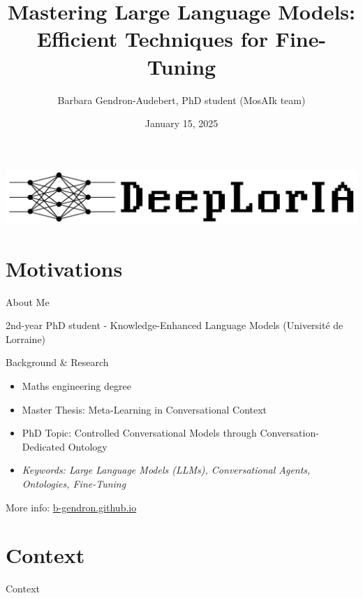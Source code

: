 \documentclass[11pt,aspectratio=169]{beamer}
\author[Barbara Gendron]{\large Barbara Gendron-Audebert, PhD student (MosAIk team)}
\title[Mastering LLM Fine-Tuning]{\huge Mastering Large Language Models: Efficient Techniques for Fine-Tuning}
\date{January 15, 2025}
\institute[DeepLorIA tutorial]{\large LORIA, Université de Lorraine, CNRS\\ DeepLorIA Network}
\begin{document}
\begin{frame}[plain]
    \vspace*{5pt}
    \begin{center}
        \includegraphics[scale=0.35]{DeepLorIA_logo1.png}
    \end{center}
    \titlepage
\end{frame}

\section{Motivations}

\begin{frame}{About Me}
\begin{center}
    2nd-year PhD student - Knowledge-Enhanced Language Models (Université de Lorraine)
\end{center}
\vspace*{10pt}
Background \& Research
    \begin{itemize}
        \item Maths engineering degree
        \item Master Thesis: Meta-Learning in Conversational Context
        \item PhD Topic: Controlled Conversational Models through Conversation-Dedicated Ontology
        \item \textsl{Keywords: Large Language Models (LLMs), Conversational Agents, Ontologies, Fine-Tuning}
    \end{itemize}

More info: \url{b-gendron.github.io}
\end{frame}

\section{Context}

\begin{frame}{Context}

\end{frame}
\end{document}
